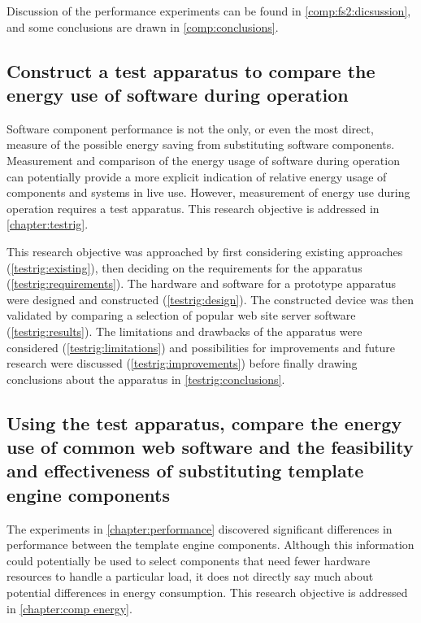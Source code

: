 Discussion of the performance experiments can be found in \autoref{comp:fs2:dicsussion}, and some conclusions are drawn in \autoref{comp:conclusions}.


\subsection{Construct a test apparatus to compare the energy use of software during operation}

Software component performance is not the only, or even the most direct, measure of the possible energy saving from substituting software components. Measurement and comparison of the energy usage of software during operation can potentially provide a more explicit indication of relative energy usage of components and systems in live use. However, measurement of energy use during operation requires a test apparatus. This research objective is addressed in \autoref{chapter:testrig}.

This research objective was approached by first considering  existing approaches (\autoref{testrig:existing}), then deciding on the requirements for the apparatus (\autoref{testrig:requirements}). The hardware and software for a prototype apparatus were designed and constructed (\autoref{testrig:design}). The constructed device was then validated by comparing a selection of popular web site server software (\autoref{testrig:results}). The limitations and drawbacks of the apparatus were considered (\autoref{testrig:limitations}) and possibilities for improvements and future research were discussed (\autoref{testrig:improvements}) before finally drawing conclusions about the apparatus in \autoref{testrig:conclusions}.


\subsection{Using the test apparatus, compare the energy use of common web software and the feasibility and effectiveness of substituting template engine components}

The experiments in \autoref{chapter:performance} discovered significant differences in performance between the \gls{template engine} components. Although this information could potentially be used to select components that need fewer hardware resources to handle a particular load, it does not directly say much about potential differences in energy consumption. This research objective is addressed in \autoref{chapter:comp energy}.

